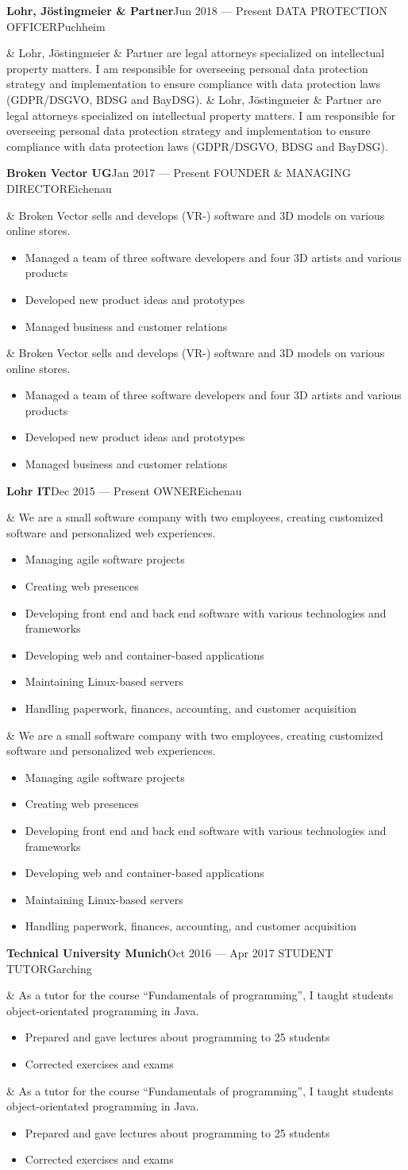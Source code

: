 \documentclass[a4paper, 11pt, final, oneside, notitlepage]{article}
\newcommand*{\bodyfont}{\sourcesanspro}
\newcommand*{\entrytitlestyle}[1]{{\fontsize{9pt}{1em}\bodyfont\scshape\color{MaterialBlueGrey800} #1}}
\newcommand*{\entrylocationstyle}[1]{{\fontsize{9pt}{1em}\bodyfont #1}}
\newcommand*{\entry}[5]{
  \noindent\begin{minipage}{\linewidth}
    \textbf{#1}\hfill#2
    \newline
    \entrytitlestyle{\MakeUppercase{#3}}\hfill\entrylocationstyle{#4}\par
    \ifx&#5&%
    \else
    #5
    \fi
    \vspace{1.25ex}
  \end{minipage}
}
\begin{document}
  \entry{Lohr, Jöstingmeier \& Partner}{Jun 2018 --- Present}{Data Protection Officer}{Puchheim}{%
    Lohr, Jöstingmeier \& Partner are legal attorneys specialized on intellectual property matters.
    I am responsible for overseeing personal data protection strategy and implementation to ensure compliance with data protection laws (GDPR/DSGVO, BDSG and BayDSG).
  }

  \entry{Broken Vector UG}{Jan 2017 --- Present}{Founder \& Managing Director}{Eichenau}{%
    Broken Vector sells and develops (VR-) software and 3D models on various online stores.
    \begin{itemize}[noitemsep, nosep]
      \item Managed a team of three software developers and four 3D artists and various products
      \item Developed new product ideas and prototypes
      \item Managed business and customer relations
    \end{itemize}
  }

  \entry{Lohr IT}{Dec 2015 --- Present}{Owner}{Eichenau}{%
    We are a small software company with two employees, creating customized software and personalized web experiences.
    \begin{itemize}[noitemsep, nosep]
      \item Managing agile software projects
      \item Creating web presences
      \item Developing front end and back end software with various technologies and frameworks
      \item Developing web and container-based applications
      \item Maintaining Linux-based servers
      \item Handling paperwork, finances, accounting, and customer acquisition
    \end{itemize}
  }

  \entry{Technical University Munich}{Oct 2016 --- Apr 2017}{Student Tutor}{Garching}{%
    As a tutor for the course \enquote{Fundamentals of programming}, I taught students object-orientated programming in Java.
    \begin{itemize}[noitemsep, nosep]
      \item Prepared and gave lectures about programming to 25 students
      \item Corrected exercises and exams
    \end{itemize}
  }
\end{document}
